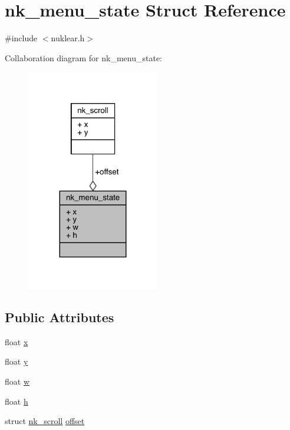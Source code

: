 \hypertarget{structnk__menu__state}{}\section{nk\+\_\+menu\+\_\+state Struct Reference}
\label{structnk__menu__state}


{\ttfamily \#include $<$nuklear.\+h$>$}



Collaboration diagram for nk\+\_\+menu\+\_\+state\+:
\nopagebreak
\begin{figure}[H]
\begin{center}
\leavevmode
\includegraphics[width=164pt]{structnk__menu__state__coll__graph}
\end{center}
\end{figure}
\subsection*{Public Attributes}
\begin{DoxyCompactItemize}
\item 
float \mbox{\hyperlink{structnk__menu__state_a9a8e94b2aa566d747731e543de318150}{x}}
\item 
float \mbox{\hyperlink{structnk__menu__state_a23f425097a6d2ace1e954a593149584c}{y}}
\item 
float \mbox{\hyperlink{structnk__menu__state_a03bc0fc57cc730e820c1c3f6b55ae389}{w}}
\item 
float \mbox{\hyperlink{structnk__menu__state_a9cdc4e270abddf8ca2439344462d000e}{h}}
\item 
struct \mbox{\hyperlink{structnk__scroll}{nk\+\_\+scroll}} \mbox{\hyperlink{structnk__menu__state_a5c9dbc6f4874d334884970a3a50a9106}{offset}}
\end{DoxyCompactItemize}


